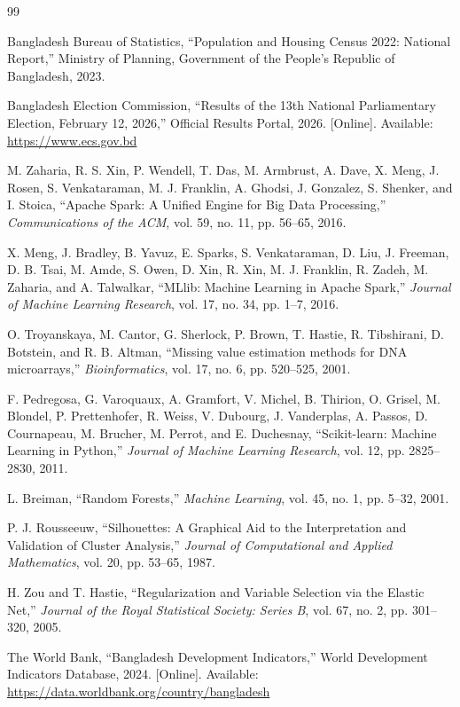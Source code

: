 \documentclass[12pt, a4paper]{article}
\begin{document}
\begin{thebibliography}{99}

Bangladesh Bureau of Statistics, ``Population and Housing Census 2022: National Report,'' Ministry of Planning, Government of the People's Republic of Bangladesh, 2023.

Bangladesh Election Commission, ``Results of the 13th National Parliamentary Election, February 12, 2026,'' Official Results Portal, 2026. [Online]. Available: \url{https://www.ecs.gov.bd}

M. Zaharia, R. S. Xin, P. Wendell, T. Das, M. Armbrust, A. Dave, X. Meng, J. Rosen, S. Venkataraman, M. J. Franklin, A. Ghodsi, J. Gonzalez, S. Shenker, and I. Stoica, ``Apache Spark: A Unified Engine for Big Data Processing,'' \textit{Communications of the ACM}, vol. 59, no. 11, pp. 56--65, 2016.

X. Meng, J. Bradley, B. Yavuz, E. Sparks, S. Venkataraman, D. Liu, J. Freeman, D. B. Tsai, M. Amde, S. Owen, D. Xin, R. Xin, M. J. Franklin, R. Zadeh, M. Zaharia, and A. Talwalkar, ``MLlib: Machine Learning in Apache Spark,'' \textit{Journal of Machine Learning Research}, vol. 17, no. 34, pp. 1--7, 2016.

O. Troyanskaya, M. Cantor, G. Sherlock, P. Brown, T. Hastie, R. Tibshirani, D. Botstein, and R. B. Altman, ``Missing value estimation methods for DNA microarrays,'' \textit{Bioinformatics}, vol. 17, no. 6, pp. 520--525, 2001.

F. Pedregosa, G. Varoquaux, A. Gramfort, V. Michel, B. Thirion, O. Grisel, M. Blondel, P. Prettenhofer, R. Weiss, V. Dubourg, J. Vanderplas, A. Passos, D. Cournapeau, M. Brucher, M. Perrot, and E. Duchesnay, ``Scikit-learn: Machine Learning in Python,'' \textit{Journal of Machine Learning Research}, vol. 12, pp. 2825--2830, 2011.

L. Breiman, ``Random Forests,'' \textit{Machine Learning}, vol. 45, no. 1, pp. 5--32, 2001.

P. J. Rousseeuw, ``Silhouettes: A Graphical Aid to the Interpretation and Validation of Cluster Analysis,'' \textit{Journal of Computational and Applied Mathematics}, vol. 20, pp. 53--65, 1987.

H. Zou and T. Hastie, ``Regularization and Variable Selection via the Elastic Net,'' \textit{Journal of the Royal Statistical Society: Series B}, vol. 67, no. 2, pp. 301--320, 2005.

The World Bank, ``Bangladesh Development Indicators,'' World Development Indicators Database, 2024. [Online]. Available: \url{https://data.worldbank.org/country/bangladesh}

\end{thebibliography}
\end{document}
